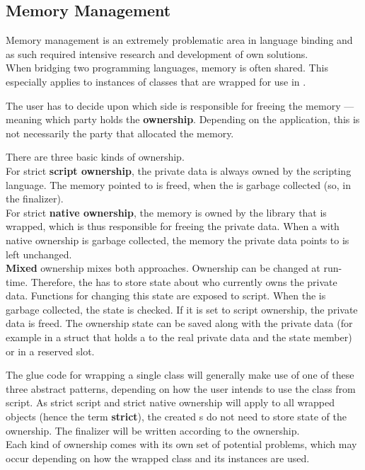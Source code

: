 \subsection{Memory Management}
\label{sec:MemoryManagement}

Memory management is an extremely problematic area in language binding and as such required intensive research and development of own solutions.\\
When bridging two programming languages, memory is often shared. This especially applies to instances of  classes that are wrapped for use in .

The  user has to decide upon which side is responsible for freeing \linebreak the memory --- meaning which party holds the \textbf{ownership}. Depending on the \linebreak application, this is not necessarily the party that allocated the memory.

There are three basic kinds of ownership.\\
For strict \textbf{script ownership}, the private data is always owned by the scripting language. The memory pointed to is freed, when the  is garbage collected (so, in the finalizer).\\
For strict \textbf{native ownership}, the memory is owned by the  library that is wrapped, which is thus responsible for freeing the private data. When a  with native ownership is garbage collected, the memory the private data points to is left unchanged.\\
\textbf{Mixed} ownership mixes both approaches. Ownership can be changed at run-time. Therefore, the  has to store state about who currently owns the private data. Functions for changing this state are exposed to script. When the  is garbage collected, the state is checked. If it is set to script ownership, the private data is freed. The ownership state can be saved along with the private data (for example in a struct that holds a  to the real private data and the state member) or in a reserved slot.

The glue code for wrapping a single class will generally make use of one of these three abstract patterns, depending on how the user intends to use the class from script. As strict script and strict native ownership will apply to all wrapped objects (hence the term \textbf{strict}), the created s do not need to store state of the ownership. The finalizer will be written according to the ownership.\\
Each kind of ownership comes with its own set of potential problems, which may occur depending on how the wrapped class and its instances are used.

